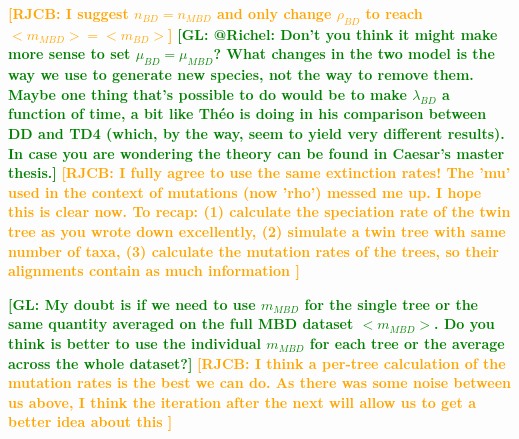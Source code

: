 \documentclass{article}
\newcommand*\richel[1]{\textcolor{orange}{\textbf{[RJCB: #1]}}}
\newcommand*\gio[1]{\textcolor{green}{\textbf{[GL: #1]}}}
\begin{document}
\begin{itemize}
\richel{I suggest $n_{BD} = n_{MBD}$ and only 
change $\rho_{BD}$ to reach $<m_{MBD}> = <m_{BD}>$}
\gio{@Richel: Don't you think it might make more sense to set $\mu_{BD} = \mu_{MBD}$? What changes in the two model is the way we use to generate new species, not the way to remove them. Maybe one thing that's possible to do would be to make $\lambda_{BD}$ a function of time, a bit like Théo is doing in his comparison between DD and TD4 (which, by the way, seem to yield very different results). In case you are wondering the theory can be found in Caesar's master thesis.}
\richel{
  I fully agree to use the same extinction rates!
  The 'mu' used in the context of mutations (now 'rho') messed me up.
  I hope this is clear now. To recap: 
  (1) calculate the speciation rate of the twin tree as you wrote down excellently,
  (2) simulate a twin tree with same number of taxa,
  (3) calculate the mutation rates of the trees, 
    so their alignments contain as much information
}






\gio{My doubt is if we need to use $m_{MBD}$ for the single tree or the same
quantity averaged on the full MBD dataset $<m_{MBD}>$.
Do you think is better to use the
individual $m_{MBD}$ for each tree or the average across the whole
dataset?}
\richel{
  I think a per-tree calculation of the mutation rates 
  is the best we can do. As there was some noise between us above,
  I think the iteration after the next will allow us to get a better
  idea about this
}


\end{itemize}
\end{document}
